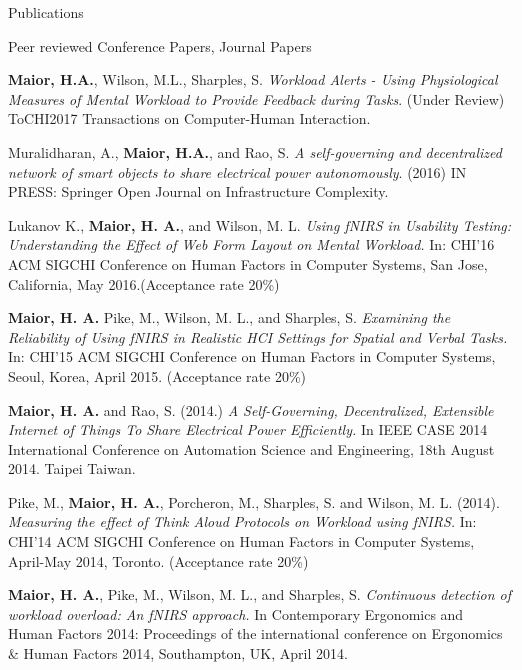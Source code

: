 \documentclass{resume} %
\begin{document}
\begin{rSection}{Publications}
\begin{rSubsection}{ }{ }{ }{Peer reviewed Conference Papers, Journal Papers}
	
\item \textbf{Maior, H.A.}, Wilson, M.L., Sharples, S. \emph{Workload Alerts - Using Physiological Measures of Mental Workload to Provide Feedback during Tasks}. (Under Review) ToCHI2017 Transactions on Computer-Human Interaction.

\item Muralidharan, A., \textbf{Maior, H.A.}, and Rao, S. \emph{A self-governing and decentralized network of smart objects to share electrical power autonomously}. (2016) IN PRESS: Springer Open Journal on Infrastructure Complexity.
 	
\item Lukanov K., \textbf{Maior, H. A.}, and Wilson, M. L. \emph{Using fNIRS in Usability Testing: Understanding the Effect of Web Form Layout on Mental Workload.} In: CHI'16 ACM SIGCHI Conference on Human Factors in Computer Systems, San Jose, California, May 2016.(Acceptance rate 20\%)

\item \textbf{Maior, H. A.} Pike, M., Wilson, M. L., and Sharples, S. \emph{Examining the Reliability of Using fNIRS in Realistic HCI Settings for Spatial and Verbal Tasks.} In: CHI'15 ACM SIGCHI Conference on Human Factors in Computer Systems, Seoul, Korea, April 2015. (Acceptance rate 20\%)

\item \textbf{Maior, H. A.} and Rao, S. (2014.) \emph{A Self-Governing, Decentralized, Extensible Internet of Things To Share Electrical Power Efficiently.} In IEEE CASE 2014 International Conference on Automation Science and Engineering, 18th August 2014. Taipei Taiwan.

\item Pike, M., \textbf{Maior, H. A.}, Porcheron, M., Sharples, S. and Wilson, M. L. (2014). \emph{Measuring the effect of Think Aloud Protocols on Workload using fNIRS.} In: CHI'14 ACM SIGCHI Conference on Human Factors in Computer Systems, April-May 2014, Toronto. (Acceptance rate 20\%)

\item \textbf{Maior, H. A.}, Pike, M., Wilson, M. L., and Sharples, S. \emph{Continuous detection of workload overload: An fNIRS approach.} In Contemporary Ergonomics and Human Factors 2014: Proceedings of the international conference on Ergonomics \& Human Factors 2014, Southampton, UK, April 2014.
\end{rSubsection}


\end{rSection}
\end{document}
